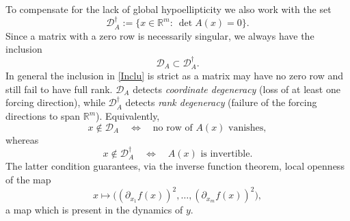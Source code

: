 \documentclass[11pt, a4paper,leqno]{amsart}
\theoremstyle{definition}
\numberwithin{equation}{section}
\newcommand{\R}{\mathbb R}
\begin{document}
To compensate for the lack of global hypoellipticity we also work with the set
\begin{equation}\label{dagga}
\mathcal D_A^\dagger:=\{x\in\R^m:\ \det A(x)=0\}.
\end{equation}
Since a matrix with a zero row is necessarily singular, we always have the inclusion
\begin{equation}\label{Inclu}
\mathcal D_A \subset \mathcal D_A^\dagger.
\end{equation}
In general the inclusion in \eqref{Inclu} is strict as a matrix may have no zero row and still fail to have full rank. $\mathcal D_A$ detects \emph{coordinate degeneracy} (loss of at least one forcing direction),
while $\mathcal D_A^\dagger$ detects \emph{rank degeneracy} (failure of the forcing directions
to span $\R^m$). Equivalently,
\[
x\notin\mathcal D_A
\quad\Longleftrightarrow\quad
\text{no row of }A(x)\text{ vanishes},
\]
whereas
\[
x\notin\mathcal D_A^\dagger
\quad\Longleftrightarrow\quad
A(x)\text{ is invertible}.
\]
The latter condition  guarantees,
via the inverse function theorem, local openness of the map
\begin{equation}\label{aaaa+}
x\mapsto\big((\partial_{x_1}f(x))^2,\dots,(\partial_{x_m}f(x))^2\big),
\end{equation}
a map which is present in the dynamics of $y$.
\end{document}
